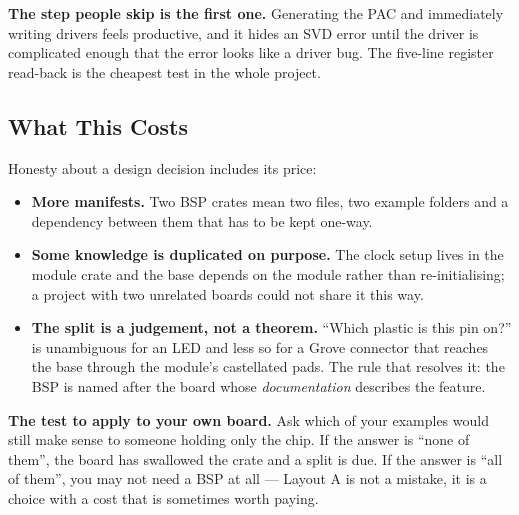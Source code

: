 \begin{warningbox}
    \textbf{The step people skip is the first one.} Generating the PAC and immediately
    writing drivers feels productive, and it hides an SVD error until the driver is
    complicated enough that the error looks like a driver bug. The five-line register
    read-back is the cheapest test in the whole project.
\end{warningbox}

\subsection{What This Costs}

Honesty about a design decision includes its price:

\begin{itemize}
    \item \textbf{More manifests.} Two BSP crates mean two  files, two
          example folders and a dependency between them that has to be kept one-way.
    \item \textbf{Some knowledge is duplicated on purpose.} The clock setup lives in the
          module crate and the base depends on the module rather than re-initialising; a
          project with two unrelated boards could not share it this way.
    \item \textbf{The split is a judgement, not a theorem.} ``Which plastic is this pin on?''
          is unambiguous for an LED and less so for a Grove connector that reaches the base
          through the module's castellated pads. The rule that resolves it: the BSP is named
          after the board whose \emph{documentation} describes the feature.
\end{itemize}

\begin{notebox}
    \textbf{The test to apply to your own board.} Ask which of your examples would still make
    sense to someone holding only the chip. If the answer is ``none of them'', the board has
    swallowed the crate and a split is due. If the answer is ``all of them'', you may not need
    a BSP at all — Layout A is not a mistake, it is a choice with a cost that is sometimes
    worth paying.
\end{notebox}
